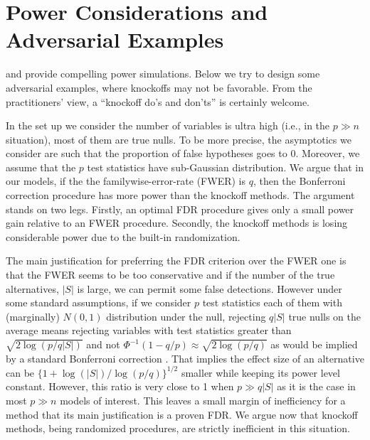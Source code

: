 \documentclass[article,lineno]{biometrika}
\begin{document}
	
	
	
	
	\section{Power Considerations and Adversarial Examples}
	
	\cite{SesiaGenehuntinghidden} and \cite{CandesPanninggoldmodelX2018} provide compelling power simulations.
	Below we try to design some adversarial examples, where knockoffs may not be favorable. 
	From the practitioners' view, a ``knockoff do's and don'ts'' is certainly welcome. 
	
	In the set up we consider the number of variables is ultra high (i.e., in the $p\gg n$ situation), most of them are true nulls. 
	To be more precise, the asymptotics we consider are such that 
	the proportion of false hypotheses 
	goes to 0. Moreover, we assume that the $p$ test statistics have sub-Gaussian distribution. We argue that in our models, if the the familywise-error-rate (FWER) is $q$, then  the Bonferroni correction procedure has more power than the knockoff methods. The argument stands on two legs. Firstly, an optimal FDR procedure gives only a small power gain relative to an FWER procedure. Secondly, the knockoff methods is losing considerable power due to the built-in randomization.
	
	The main justification for preferring the FDR criterion over the FWER one is that the FWER seems to be too conservative and if the number of the true alternatives, $|S|$ is large, we can permit some  false detections. However under some standard assumptions, if we consider $p$ test statistics each of them with (marginally) $N(0,1)$ distribution under the null, rejecting $q|S|$ true nulls on the average means rejecting variables with test statistics greater than $\sqrt{2\log(p/q|S|)}$ and not $\Phi^{-1}(1-q/p)\approx\sqrt{2\log (p/q)}$ as would be implied by a standard Bonferroni correction .
	That implies  the effect size of an alternative can be $\bigl\{1+\log(|S|)/\log (p/q)\bigr\}^{1/2}$ smaller while keeping its power level constant. However, this ratio is very close to 1 when $p\gg q|S|$ as it is the case in most $p\gg n$ models of interest. This leaves a small margin of inefficiency for a method that its main justification is a proven FDR.
	We argue now that knockoff methods, being randomized procedures, are strictly inefficient in this situation.
	
\end{document}
